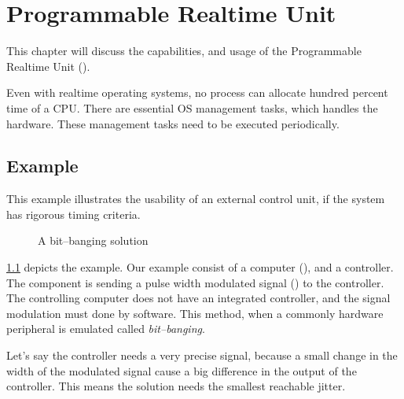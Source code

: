 \chapter{Programmable Realtime Unit}
\label{chap:pru}

This chapter will discuss the capabilities, and usage of the Programmable Realtime Unit ().

Even with realtime operating systems, no process can allocate hundred percent time of a CPU. There are essential OS management tasks, which handles the hardware. These management tasks need to be executed periodically.

\section{Example}
\label{subsec:example}

This example illustrates the usability of an external control unit, if the system has rigorous timing criteria.

\begin{figure}[h]
	\centering
	\caption{A bit--banging solution}
	\label{fig:example_pwm}
\end{figure}

\cref{fig:example_pwm} depicts the example. Our example consist of a computer (\rtos), and a controller. The \rtos component is sending a pulse width modulated signal (\pwm) to the controller. The controlling computer does not have an integrated \pwm controller, and the signal modulation must done by software. This method, when a commonly hardware peripheral is emulated called \emph{bit--banging}.

Let's say the controller needs a very precise signal, because a small change in the width of the modulated signal cause a big difference in the output of the controller. This means the solution needs the smallest reachable jitter.


